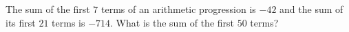 The sum of the first $7$ terms of an arithmetic progression is $-42$ and the sum of its first $21$ terms is $-714$. What is the sum of the first $50$ terms?
